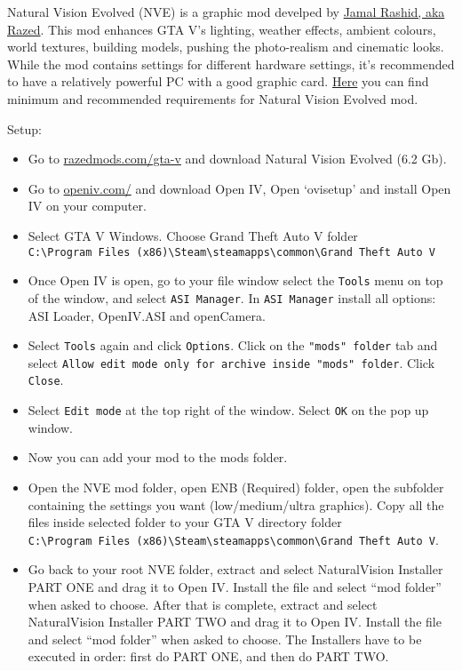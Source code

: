 \documentclass[
  openany]{book}
\begin{document}
Natural Vision Evolved (NVE) is a graphic mod develped by \href{https://www.razedmods.com/}{Jamal Rashid, aka Razed}. This mod enhances GTA V's lighting, weather effects, ambient colours, world textures, building models, pushing the photo-realism and cinematic looks. While the mod contains settings for different hardware settings, it's recommended to have a relatively powerful PC with a good graphic card. \href{https://www.systemrequirementslab.com/cyri/requirements/gta-5-naturalvision-remastered/16594}{Here} you can find minimum and recommended requirements for Natural Vision Evolved mod.

Setup:

\begin{itemize}
\item
  Go to \href{https://www.razedmods.com/gta-v}{razedmods.com/gta-v} and download Natural Vision Evolved (6.2 Gb).
\item
  Go to \href{https://openiv.com/}{openiv.com/} and download Open IV, Open `ovisetup' and install Open IV on your computer.
\item
  Select GTA V Windows. Choose Grand Theft Auto V folder \texttt{C:\textbackslash{}Program\ Files\ (x86)\textbackslash{}Steam\textbackslash{}steamapps\textbackslash{}common\textbackslash{}Grand\ Theft\ Auto\ V}
\item
  Once Open IV is open, go to your file window select the \texttt{Tools} menu on top of the window, and select \texttt{ASI\ Manager}. In \texttt{ASI\ Manager} install all options: ASI Loader, OpenIV.ASI and openCamera.
\item
  Select \texttt{Tools} again and click \texttt{Options}. Click on the \texttt{"mods"\ folder} tab and select \texttt{Allow\ edit\ mode\ only\ for\ archive\ inside\ "mods"\ folder}. Click \texttt{Close}.
\item
  Select \texttt{Edit\ mode} at the top right of the window. Select \texttt{OK} on the pop up window.
\item
  Now you can add your mod to the mods folder.
\item
  Open the NVE mod folder, open ENB (Required) folder, open the subfolder containing the settings you want (low/medium/ultra graphics). Copy all the files inside selected folder to your GTA V directory folder \texttt{C:\textbackslash{}Program\ Files\ (x86)\textbackslash{}Steam\textbackslash{}steamapps\textbackslash{}common\textbackslash{}Grand\ Theft\ Auto\ V}.
\item
  Go back to your root NVE folder, extract and select NaturalVision Installer PART ONE and drag it to Open IV. Install the file and select ``mod folder'' when asked to choose. After that is complete, extract and select NaturalVision Installer PART TWO and drag it to Open IV. Install the file and select ``mod folder'' when asked to choose. The Installers have to be executed in order: first do PART ONE, and then do PART TWO.

\end{itemize}
\end{document}
